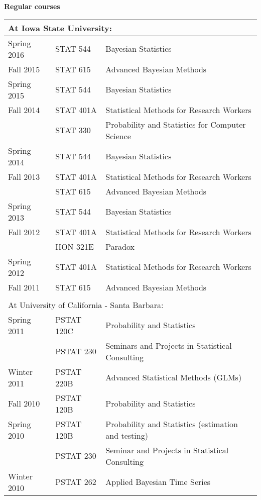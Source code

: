 \documentclass[overlapped,line]{res}
\begin{document}
\begin{resume}
{\bf Regular courses}

\begin{tabular}{lll}
\multicolumn{3}{l}{At Iowa State University:} \\
\hline
Spring 2016 & STAT 544 & Bayesian Statistics \\
Fall 2015 & STAT 615 & Advanced Bayesian Methods \\
Spring 2015 & STAT 544 & Bayesian Statistics \\
Fall 2014 & STAT 401A & Statistical Methods for Research Workers \\
& STAT 330 & Probability and Statistics for Computer Science \\
Spring 2014 & STAT 544 & Bayesian Statistics \\
Fall 2013 & STAT 401A & Statistical Methods for Research Workers \\
& STAT 615 & Advanced Bayesian Methods \\
Spring 2013 & STAT 544 & Bayesian Statistics \\
Fall 2012 & STAT 401A & Statistical Methods for Research Workers \\
 & HON 321E & Paradox \\
Spring 2012 & STAT 401A & Statistical Methods for Research Workers \\
Fall 2011 & STAT 615 & Advanced Bayesian Methods \\
\hline
\\
\multicolumn{3}{l}{At University of California - Santa Barbara:} \\
\hline
Spring 2011 & PSTAT 120C & Probability and Statistics \\ %
& PSTAT 230 & Seminars and Projects in Statistical Consulting \\
Winter 2011 & PSTAT 220B & Advanced Statistical Methods (GLMs) \\
Fall 2010  & PSTAT 120B & Probability and Statistics \\
Spring 2010 & PSTAT 120B & Probability and Statistics (estimation and testing) \\
 & PSTAT 230 & Seminar and Projects in Statistical Consulting \\
Winter 2010 & PSTAT 262 & Applied Bayesian Time Series \\
\hline
\end{tabular}

%



\end{resume}
\end{document}
